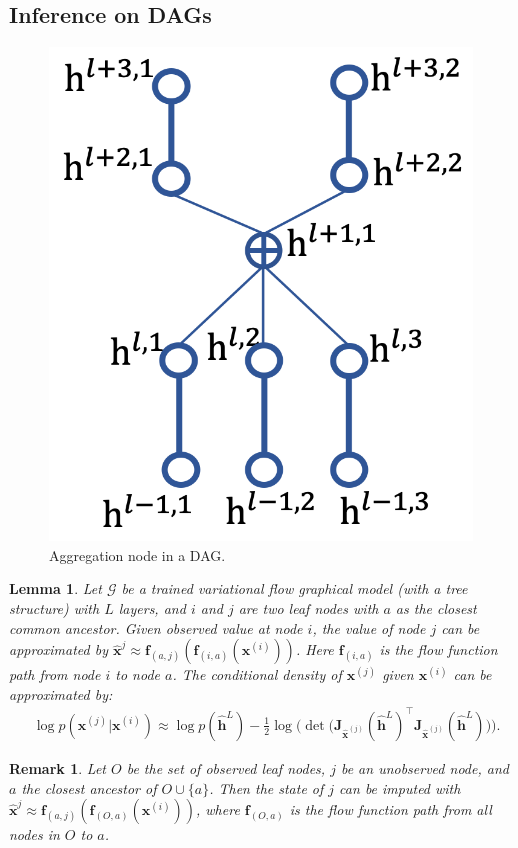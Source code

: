 \documentclass{article}
\newtheorem{lemma}{Lemma}
\newtheorem{remark}{Remark}
\begin{document}
\subsection{Inference on DAGs}
\begin{figure}[H]
\begin{center}
 \includegraphics[width=0.25\linewidth]{fig/dag_aggr.png}
\end{center}
\vspace{-0.2in}
\caption{ {\small  Aggregation node in a DAG.}}
\label{fig:dag_aggr}
\vspace{-0.15in}
\end{figure}


\begin{lemma}\label{lm:apprxapp}
Let $\mathcal{G}$ be a trained variational flow graphical model (with a tree structure) with $L$ layers, and $i$ and $j$ are two leaf nodes with $a$ as the closest common ancestor. Given observed value at node $i$, the value of node $j$ can be approximated by   $\widehat{\mathbf{x}}^{j} \approx  \mathbf{f}_{(a,j)}(\mathbf{f}_{(i, a)}(\mathbf{x}^{(i)}))$. Here $\mathbf{f}_{(i, a)}$ is the flow function path from node $i$ to node $a$. The conditional density of $\mathbf{x}^{(j)}$ given $\mathbf{x}^{(i)}$ can be approximated by: 
\begin{align} \label{eq:cond_llk}
& \log p(\mathbf{x}^{(j)} | \mathbf{x}^{(i)}) 
\approx  \log p(\widehat{\mathbf{h}}^L) -  \frac{1}{2} \log \big(\det \big(\mathbf{J}_{\widehat{\mathbf{x}}^{(j)}}(\widehat{\mathbf{h}}^L)^\top\mathbf{J}_{\widehat{\mathbf{x}}^{(j)}}(\widehat{\mathbf{h}}^L)\big) \big).
\end{align}%
\end{lemma}


\begin{remark}\label{rmk:apprx_mulapp}
Let $O$ be the set of observed leaf nodes, $j$ be an unobserved node, and $a$ the closest ancestor of $O \cup \{a\}$. 
Then the state of $j$ can be imputed with $\widehat{\mathbf{x}}^{j} \approx  \mathbf{f}_{(a,j)}(\mathbf{f}_{(O, a)}(\mathbf{x}^{(i)}))$, where $\mathbf{f}_{(O, a)}$ is the flow function path from all nodes in $O$ to $a$.
\end{remark}
\end{document}
